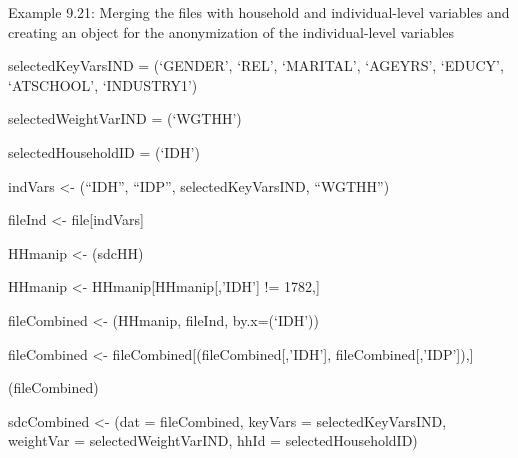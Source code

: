 \documentclass[letterpaper,10pt,english]{sphinxmanual}
\begin{document}
Example 9.21: Merging the files with household and individual-level
variables and creating an  object for the anonymization of the
individual-level variables


\begin{DUlineblock}{0em}
\item[] 
\item[] selectedKeyVarsIND = (‘GENDER’, ‘REL’, ‘MARITAL’, ‘AGEYRS’,
‘EDUCY’, ‘ATSCHOOL’, ‘INDUSTRY1’) 
\item[] 
\item[] selectedWeightVarIND = (‘WGTHH’)
\item[] 
\item[] selectedHouseholdID = (‘IDH’)
\item[] 
\item[] 
\item[] indVars \textless{}- (“IDH”, “IDP”, selectedKeyVarsIND, “WGTHH”) 
\item[] fileInd \textless{}- file{[}indVars{]} 
\end{DUlineblock}

HHmanip \textless{}- (sdcHH) 

HHmanip \textless{}- HHmanip{[}HHmanip{[},’IDH’{]} != 1782,{]}

fileCombined \textless{}- (HHmanip, fileInd, by.x=(‘IDH’))

fileCombined \textless{}- fileCombined{[}(fileCombined{[},’IDH’{]},
fileCombined{[},’IDP’{]}),{]}

(fileCombined)

\begin{DUlineblock}{0em}
\item[] 
\item[] sdcCombined \textless{}- (dat = fileCombined, keyVars =
selectedKeyVarsIND, weightVar = selectedWeightVarIND, hhId =
selectedHouseholdID)
\end{DUlineblock}
\end{document}
